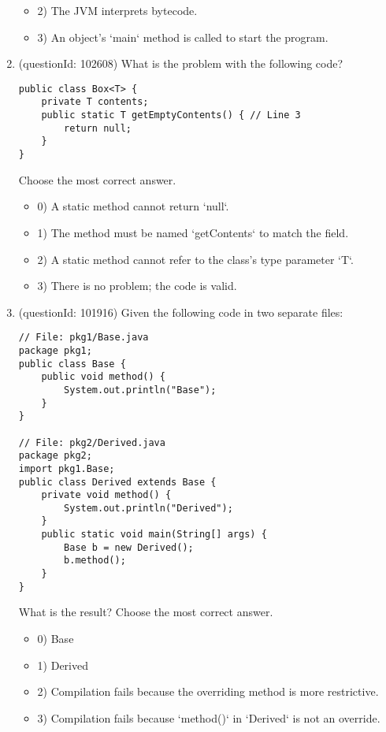 \documentclass[12pt]{article}
\begin{document}
\begin{enumerate}[label=(\arabic*)]
\begin{itemize}
\item 2) The JVM interprets bytecode.

\item 3) An object's `main` method is called to start the program.

\end{itemize}
\item (questionId: 102608) What is the problem with the following code?\begin{verbatim}
public class Box<T> {
    private T contents;
    public static T getEmptyContents() { // Line 3
        return null;
    }
}
\end{verbatim}
Choose the most correct answer. 
\begin{itemize}
\item 0) A static method cannot return `null`.

\item 1) The method must be named `getContents` to match the field.

\item 2) A static method cannot refer to the class's type parameter `T`.

\item 3) There is no problem; the code is valid.

\end{itemize}
\item (questionId: 101916) Given the following code in two separate files:
\begin{verbatim}
// File: pkg1/Base.java
package pkg1;
public class Base {
    public void method() {
        System.out.println("Base");
    }
}

// File: pkg2/Derived.java
package pkg2;
import pkg1.Base;
public class Derived extends Base {
    private void method() {
        System.out.println("Derived");
    }
    public static void main(String[] args) {
        Base b = new Derived();
        b.method();
    }
}
\end{verbatim}
What is the result?
Choose the most correct answer. 
\begin{itemize}
\item 0) Base

\item 1) Derived

\item 2) Compilation fails because the overriding method is more restrictive.

\item 3) Compilation fails because `method()` in `Derived` is not an override.


\end{itemize}
\end{enumerate}
\end{document}
